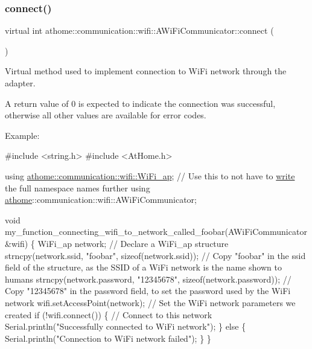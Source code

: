 \subsubsection{\texorpdfstring{connect()}{connect()}}
{\footnotesize\ttfamily virtual int athome\+::communication\+::wifi\+::\+A\+Wi\+Fi\+Communicator\+::connect (\begin{DoxyParamCaption}{ }\end{DoxyParamCaption})\hspace{0.3cm}{\ttfamily [pure virtual]}}

Virtual method used to implement connection to Wi\+Fi network through the adapter.

A return value of 0 is expected to indicate the connection was successful, otherwise all other values are available for error codes.

Example\+:


\begin{DoxyCode}
\textcolor{preprocessor}{#include <string.h>}
\textcolor{preprocessor}{#include <AtHome.h>}

\textcolor{keyword}{using} \mbox{\hyperlink{structathome_1_1communication_1_1wifi_1_1s__wifi__access__point}{athome::communication::wifi::WiFi\_ap}}; \textcolor{comment}{// Use this to not have to}
\mbox{\hyperlink{classathome_1_1communication_1_1_a_network_communicator_a87adf68359a4ec5b0a38bea529ebf732}{write}} the full \textcolor{keyword}{namespace }names further using
\mbox{\hyperlink{namespaceathome}{athome}}::communication::wifi::AWiFiCommunicator;

void my\_function\_connecting\_wifi\_to\_network\_called\_foobar(AWiFiCommunicator
&wifi) \{ WiFi\_ap network; \textcolor{comment}{// Declare a WiFi\_ap structure}
  strncpy(network.ssid, \textcolor{stringliteral}{"foobar"}, \textcolor{keyword}{sizeof}(network.ssid)); \textcolor{comment}{// Copy "foobar"}
in the ssid field of the structure, as the SSID of a WiFi network is the
name shown to humans strncpy(network.password, \textcolor{stringliteral}{"12345678"},
\textcolor{keyword}{sizeof}(network.password)); \textcolor{comment}{// Copy "12345678" in the password field, to set}
the password used by the WiFi network wifi.setAccessPoint(network); \textcolor{comment}{// Set}
the WiFi network parameters we created \textcolor{keywordflow}{if} (!wifi.connect()) \{ \textcolor{comment}{// Connect to}
\textcolor{keyword}{this} network Serial.println(\textcolor{stringliteral}{"Successfully connected to WiFi network"}); \}
\textcolor{keywordflow}{else} \{ Serial.println(\textcolor{stringliteral}{"Connection to WiFi network failed"});
  \}
\}
\end{DoxyCode}
 

